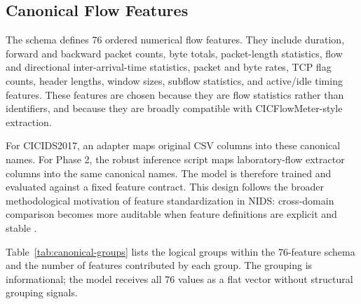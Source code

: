 \subsection{Canonical Flow Features}
The schema defines 76 ordered numerical flow features. They include duration, forward and backward packet counts, byte totals, packet-length statistics, flow and directional inter-arrival-time statistics, packet and byte rates, TCP flag counts, header lengths, window sizes, subflow statistics, and active/idle timing features. These features are chosen because they are flow statistics rather than identifiers, and because they are broadly compatible with CICFlowMeter-style extraction.

For CICIDS2017, an adapter maps original CSV columns into these canonical names. For Phase 2, the robust inference script maps laboratory-flow extractor columns into the same canonical names. The model is therefore trained and evaluated against a fixed feature contract. This design follows the broader methodological motivation of feature standardization in NIDS: cross-domain comparison becomes more auditable when feature definitions are explicit and stable \parencite{Sarhan2021}.

Table~\ref{tab:canonical-groups} lists the logical groups within the 76-feature schema and the number of features contributed by each group. The grouping is informational; the model receives all 76 values as a flat vector without structural grouping signals.

